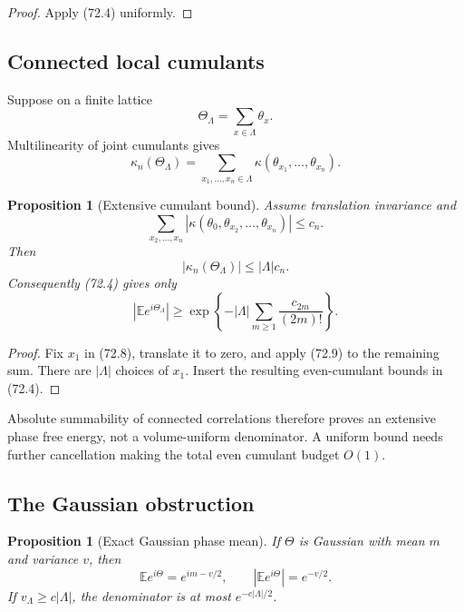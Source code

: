 \documentclass[11pt]{article}
\newtheorem{proposition}[theorem]{Proposition}
\begin{document}
\begin{proof}
Apply (72.4) uniformly.
\end{proof}

\subsection{Connected local cumulants}

Suppose on a finite lattice
\[
                              \Theta_\Lambda=\sum_{x\in\Lambda}\theta_x.
                                                                  \tag{72.7}
\]
Multilinearity of joint cumulants gives
\[
 \kappa_n(\Theta_\Lambda)
 =\sum_{x_1,\ldots,x_n\in\Lambda}
                  \kappa(\theta_{x_1},\ldots,\theta_{x_n}).    \tag{72.8}
\]

\begin{proposition}[Extensive cumulant bound]
\label{prop:v11v72-extensive}
Assume translation invariance and
\[
 \sum_{x_2,\ldots,x_n}
 |\kappa(\theta_0,\theta_{x_2},\ldots,\theta_{x_n})|
                              \le c_n.                         \tag{72.9}
\]
Then
\[
                         |\kappa_n(\Theta_\Lambda)|
                              \le|\Lambda|c_n.                 \tag{72.10}
\]
Consequently (72.4) gives only
\[
 |{\mathbb E}e^{i\Theta_\Lambda}|
 \ge\exp\left\{-|\Lambda|
        \sum_{m\ge1}\frac{c_{2m}}{(2m)!}\right\}.             \tag{72.11}
\]
\end{proposition}

\begin{proof}
Fix \(x_1\) in (72.8), translate it to zero, and apply (72.9) to the
remaining sum.  There are \(|\Lambda|\) choices of \(x_1\).
Insert the resulting even-cumulant bounds in (72.4).
\end{proof}

Absolute summability of connected correlations therefore proves an
extensive phase free energy, not a volume-uniform denominator.  A
uniform bound needs further cancellation making the total even
cumulant budget \(O(1)\).

\subsection{The Gaussian obstruction}

\begin{proposition}[Exact Gaussian phase mean]
\label{prop:v11v72-gaussian}
If \(\Theta\) is Gaussian with mean \(m\) and variance \(v\), then
\[
                         {\mathbb E}e^{i\Theta}
                              =e^{im-v/2},\qquad
                         |{\mathbb E}e^{i\Theta}|=e^{-v/2}.    \tag{72.12}
\]
If \(v_\Lambda\ge c|\Lambda|\), the denominator is at most
\(e^{-c|\Lambda|/2}\).
\end{proposition}
\end{document}
